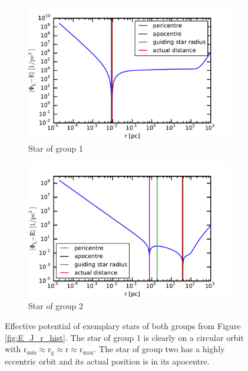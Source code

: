 \begin{figure}[htbp]
\centering
	\begin{subfigure}{0.475\textwidth}
	\centering
	\includegraphics[width=\textwidth]{Plots/pot_eff_group1.pdf}
	\caption{Star of group 1}
	\label{fig:pot_eff_group1}
	\end{subfigure}
	\hfill
	\begin{subfigure}{0.475\textwidth}
	\centering
	\includegraphics[width=\textwidth]{Plots/pot_eff_group2.pdf}
	\caption{Star of group 2}
	\label{fig:pot_eff_group2}
	\end{subfigure}	
\caption{Effective potential of exemplary stars of both groups from Figure \ref{fig:E_J_r_hist}. The star of group 1 is clearly on a circular orbit with \(\mathrm{r_{min}\approx r_g\approx r \approx r_{max} }\). The star of group two has a highly eccentric orbit and its actual position is in its apocentre.}
\label{fig:eff_pot}
\end{figure}

